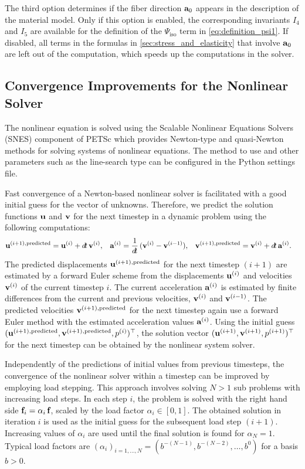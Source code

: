 The third option determines if the fiber direction $\textbf{a}_0$ appears in the description of the material model. Only if this option is enabled, the corresponding invariants $I_4$ and $I_5$ are available for the definition of the $\Psi_\text{iso}$ term in \cref{eq:definition_psi1}. If disabled, all terms in the formulas in \cref{sec:stress_and_elasticity} that involve $\textbf{a}_0$ are left out of the computation, which speeds up the computations in the solver.

\subsection{Convergence Improvements for the Nonlinear Solver}\label{sec:convergence_improvements_for_the_nonlinear_solver}

The nonlinear equation is solved using the Scalable Nonlinear Equations Solvers (SNES) component of PETSc which provides Newton-type and quasi-Newton methods for solving systems of nonlinear equations. The method to use and other parameters such as the line-search type can be configured in the Python settings file.

Fast convergence of a Newton-based nonlinear solver is facilitated with a good initial guess for the vector of unknowns. Therefore, we predict the solution functions $\textbf{u}$ and $\textbf{v}$ for the next timestep in a dynamic problem using the following computations:
\begin{align*}
  \bfu^{(i+1),\text{predicted}} &= \bfu^{(i)} + \dt\,\bfv^{(i)}, & 
  \bfa^{(i)} &= \dfrac1{\dt}(\bfv^{(i)} - \bfv^{(i-1)}), & 
  \bfv^{(i+1),\text{predicted}} &= \bfv^{(i)} + \dt\,\bfa^{(i)}.
\end{align*}
%
The predicted displacements $\textbf{u}^{(i+1),\text{predicted}}$ for the next timestep $(i+1)$ are estimated by a forward Euler scheme from the displacements $\textbf{u}^{(i)}$ and velocities $\textbf{v}^{(i)}$ of the current timestep $i$. The current acceleration $\textbf{a}^{(i)}$ is estimated by finite differences from the current and previous velocities, $\textbf{v}^{(i)}$ and $\textbf{v}^{(i-1)}$. The predicted velocities $\textbf{v}^{(i+1),\text{predicted}}$ for the next timestep again use a forward Euler method with the estimated acceleration values $\textbf{a}^{(i)}$.
Using the initial guess $(\textbf{u}^{(i+1),\text{predicted}},\textbf{v}^{(i+1),\text{predicted}},p^{(i)})^\top$, the solution vector $(\textbf{u}^{(i+1)},\textbf{v}^{(i+1)},p^{(i+1)})^\top$  for the next timestep can be obtained by the nonlinear system solver.

Independently of the predictions of initial values from previous timesteps, the convergence of the nonlinear solver within a timestep can be  improved by employing load stepping. This approach involves solving $N>1$ sub problems with increasing load steps. In each step $i$, the problem is solved with the right hand side $\textbf{f}_i = \alpha_i\,\textbf{f}$, scaled by the load factor $\alpha_i \in [0,1]$. The obtained solution in iteration $i$ is used as the initial guess for the subsequent load step $(i+1)$. Increasing values of $\alpha_i$ are used until the final solution is found for $\alpha_N=1$. Typical load factors are $(\alpha_i)_{i=1,\dots,N} = (b^{-(N-1)}, b^{-(N-2)}, \dots, b^{0})$ for a basis $b>0$.

